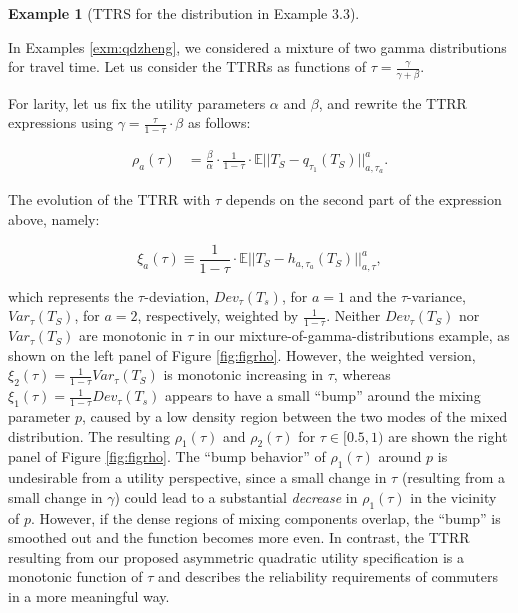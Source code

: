 \documentclass[preprint, 3p, authoryear]{elsarticle} %
\theoremstyle{definition}
\theoremstyle{definition}
\newtheorem{example}{Example}[section]
\theoremstyle{definition}
\theoremstyle{definition}
\theoremstyle{remark}
\begin{document}
\begin{example}[TTRS for the distribution in Example 3.3]
\protect\hypertarget{exm:trrs}{}\label{exm:trrs}

In Examples \ref{exm:qdzheng}, we considered a mixture of two gamma distributions for travel time. Let us consider the TTRRs as functions of \(\tau=\frac{\gamma}{\gamma+\beta}\).

For larity, let us fix the utility parameters \(\alpha\) and \(\beta\), and rewrite the TTRR expressions using \(\gamma = \frac \tau{1-\tau}\cdot \beta\) as follows:

\begin{align}
\rho_a(\tau) &= \frac \beta\alpha\cdot\frac1{1-\tau}\cdot\mathbb E||T_S-q_{\tau_1}(T_S)||^a_{a,\tau_a}.
\end{align}

The evolution of the TTRR with \(\tau\) depends on the second part of the expression above, namely:

\[\xi_a(\tau)\equiv \frac1{1-\tau}\cdot\mathbb E||T_S-h_{a,\tau_a}(T_S)||_{a,\tau}^a,\]

which represents the \(\tau\)-deviation, \(Dev_\tau (T_s)\), for \(a=1\) and the \(\tau\)-variance, \(Var_\tau (T_S)\), for \(a=2\), respectively, weighted by \(\frac1{1-\tau}\). Neither \(Dev_\tau(T_S)\) nor \(Var_\tau(T_S)\) are monotonic in \(\tau\) in our mixture-of-gamma-distributions example, as shown on the left panel of Figure \ref{fig:figrho}. However, the weighted version, \(\xi_2(\tau)=\frac1{1-\tau}Var_\tau(T_S)\) is monotonic increasing in \(\tau\), whereas \(\xi_1(\tau)=\frac1{1-\tau}Dev_\tau (T_s)\) appears to have a small ``bump'' around the mixing parameter \(p\), caused by a low density region between the two modes of the mixed distribution. The resulting \(\rho_1(\tau)\) and \(\rho_2(\tau)\) for \(\tau\in[0.5,1)\) are shown the right panel of Figure \ref{fig:figrho}. The ``bump behavior'' of \(\rho_1(\tau)\) around \(p\) is undesirable from a utility perspective, since a small change in \(\tau\) (resulting from a small change in \(\gamma\)) could lead to a substantial \emph{decrease} in \(\rho_1(\tau)\) in the vicinity of \(p\). However, if the dense regions of mixing components overlap, the ``bump'' is smoothed out and the function becomes more even. In contrast, the TTRR resulting from our proposed asymmetric quadratic utility specification is a monotonic function of \(\tau\) and describes the reliability requirements of commuters in a more meaningful way.


\end{example}
\end{document}
